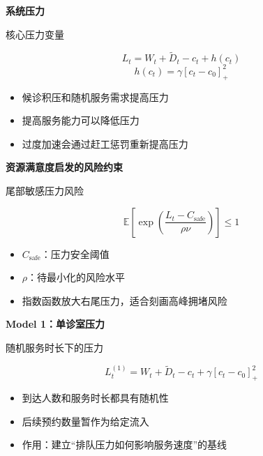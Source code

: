 \documentclass[aspectratio=169,UTF8,zihao=-4]{ctexbeamer}
\newcommand{\bigidea}[1]{
  \begin{center}
    \vspace{0.8em}
    {\LARGE \bfseries #1}
    \vspace{0.6em}
  \end{center}
}
\begin{document}
\begin{frame}
  \bigidea{系统压力}
  \begin{block}{核心压力变量}
  \begin{center}
    {\Large
    \[
      L_t = W_t + \widetilde{D}_t - c_t + h(c_t)
    \]
    \[
      h(c_t)=\gamma[c_t-c_0]_+^2
    \]
    }
  \end{center}
  \end{block}
  \begin{itemize}
    \item \Large 候诊积压和随机服务需求提高压力
    \item \Large 提高服务能力可以降低压力
    \item \Large 过度加速会通过赶工惩罚重新提高压力
  \end{itemize}
\end{frame}

\begin{frame}
  \bigidea{资源满意度启发的风险约束}
  \begin{block}{尾部敏感压力风险}
  \begin{center}
    {\Large
    \[
      \mathbb{E}\left[\exp\left(\frac{L_t-C_{\mathrm{safe}}}{\rho\nu}\right)\right]\leq 1
    \]
    }
  \end{center}
  \end{block}
  \begin{itemize}
    \item \Large $C_{\mathrm{safe}}$：压力安全阈值
    \item \Large $\rho$：待最小化的风险水平
    \item \Large 指数函数放大右尾压力，适合刻画高峰拥堵风险
  \end{itemize}
\end{frame}

\begin{frame}
  \bigidea{Model 1：单诊室压力}
  \begin{block}{随机服务时长下的压力}
  \begin{center}
    {\Large
    \[
      L_t^{(1)}=W_t+\widetilde{D}_t-c_t+\gamma[c_t-c_0]_+^2
    \]
    }
  \end{center}
  \end{block}
  \begin{itemize}
    \item \Large 到达人数和服务时长都具有随机性
    \item \Large 后续预约数量暂作为给定流入
    \item \Large 作用：建立“排队压力如何影响服务速度”的基线
  \end{itemize}
\end{frame}
\end{document}
